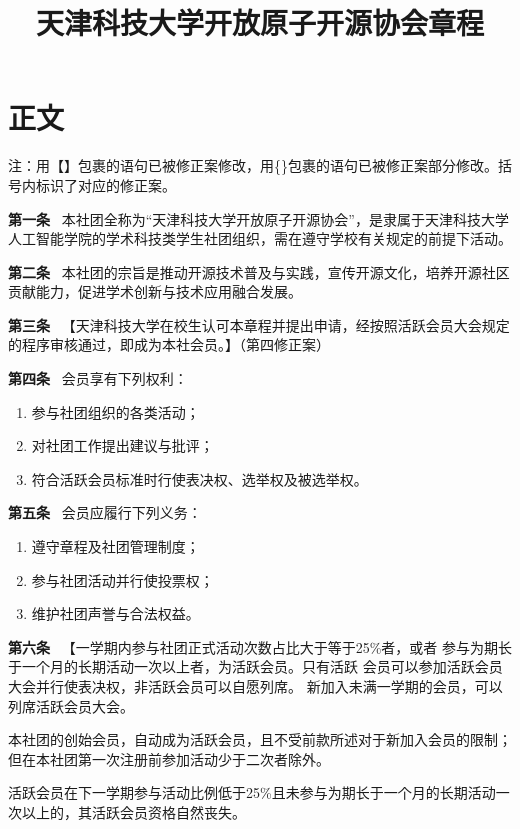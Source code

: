 \documentclass{gbt9704}
\title{天津科技大学开放原子开源协会章程}
\begin{document}
\maketitle
{}
\section{正文}
{
	\songti
	注：用【】包裹的语句已被修正案修改，用\{\}包裹的语句已被修正案部分修改。括号内标识了对应的修正案。
	
}
\songti



\textbf{第一条}~ 本社团全称为“天津科技大学开放原子开源协会”，是隶属于天津科技大学人工智能学院的学术科技类学生社团组织，需在遵守学校有关规定的前提下活动。


\textbf{第二条}~ 本社团的宗旨是推动开源技术普及与实践，宣传开源文化，培养开源社区贡献能力，促进学术创新与技术应用融合发展。


\textbf{第三条}~ 【天津科技大学在校生认可本章程并提出申请，经按照活跃会员大会规定的程序审核通过，即成为本社会员。】（第四修正案）


\textbf{第四条}~ 会员享有下列权利：
\begin{enumerate}
    \item 参与社团组织的各类活动；
    \item 对社团工作提出建议与批评；
    \item 符合活跃会员标准时行使表决权、选举权及被选举权。
\end{enumerate}


\textbf{第五条}~ 会员应履行下列义务：
\begin{enumerate}
    \item 遵守章程及社团管理制度；
    \item 参与社团活动并行使投票权；
    \item 维护社团声誉与合法权益。
\end{enumerate}


\textbf{第六条}~ 【一学期内参与社团正式活动次数占比大于等于25\%者，或者
参与为期长于一个月的长期活动一次以上者，为活跃会员。只有活跃
会员可以参加活跃会员大会并行使表决权，非活跃会员可以自愿列席。
新加入未满一学期的会员，可以列席活跃会员大会。


本社团的创始会员，自动成为活跃会员，且不受前款所述对于新加入会员的限制；但在本社团第一次注册前参加活动少于二次者除外。


活跃会员在下一学期参与活动比例低于25\%且未参与为期长于一个月的长期活动一次以上的，其活跃会员资格自然丧失。
\end{document}

